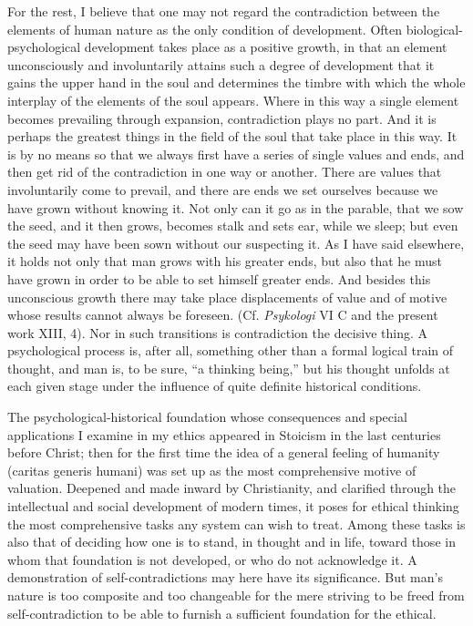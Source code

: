 \documentclass[12pt,a4paper,openany]{book}
\newcommand{\opage}[1]{\marginnote{\footnotesize\textit{[#1]}}}
\begin{document}
For the rest, I believe that one may not regard the contradiction between the elements of human nature as
the only condition of development. Often biological-psychological development takes place as a positive
growth, in that an element unconsciously and involuntarily attains such a degree of development that it
gains the upper hand in the soul and determines the timbre with which the whole interplay of the elements
of the soul appears. Where in this way a single element becomes prevailing through expansion,
contradiction plays no part. And it is perhaps the greatest things in the field of the soul that take
place in this way. It is by no means so that we always first have a series of single values and ends,
and then get rid of the contradiction in one way or another.
\opage{78}There are values that involuntarily come to prevail, and there are ends we set ourselves because we
have grown without knowing it. Not only can it go as in the parable, that we sow the seed, and it then
grows, becomes stalk and sets ear, while we sleep; but even the seed may have been sown without our
suspecting it. As I have said elsewhere, it holds not only that man grows with his greater ends, but
also that he must have grown in order to be able to set himself greater ends. And besides this
unconscious growth there may take place displacements of value and of motive whose results cannot always
be foreseen. (Cf. \textit{Psykologi} VI C and the present work XIII, 4). Nor in such transitions is
contradiction the decisive thing. A psychological process is, after all, something other than a formal
logical train of thought, and man is, to be sure, ``a thinking being,'' but his thought unfolds at each
given stage under the influence of quite definite historical conditions.

The psychological-historical foundation whose consequences and special applications I examine in my
ethics appeared in Stoicism in the last centuries before Christ; then for the first time the idea of a
general feeling of humanity (caritas generis humani) was set up as the most comprehensive motive of
valuation. Deepened and made inward by Christianity, and clarified through the intellectual and social
development of modern times, it poses for ethical thinking the most comprehensive tasks any system can
wish to treat. Among these tasks is also that of deciding how one is to stand, in thought and in life,
toward those in whom that foundation is not developed, or who do not acknowledge it. A demonstration of
self-contradictions may here have its significance. But man's nature is too composite and too changeable
for the mere striving to be freed from self-contradiction to be able to furnish a sufficient foundation
for the ethical.
\end{document}
